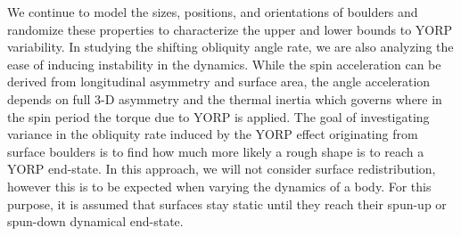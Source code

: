 


We continue to model the sizes, positions, and orientations of boulders and randomize these properties to characterize the upper and lower bounds to YORP variability. In studying the shifting obliquity angle rate, we are also analyzing the ease of inducing instability in the dynamics. While the spin acceleration can be derived from longitudinal asymmetry and surface area, the angle acceleration depends on full 3-D asymmetry and the thermal inertia which governs where in the spin period the torque due to YORP is applied. The goal of investigating variance in the obliquity rate induced by the YORP effect originating from surface boulders is to find how much more likely a rough shape is to reach a YORP end-state. In this approach, we will not consider surface redistribution, however this is to be expected when varying the dynamics of a body. For this purpose, it is assumed that surfaces stay static until they reach their spun-up or spun-down dynamical end-state.  

